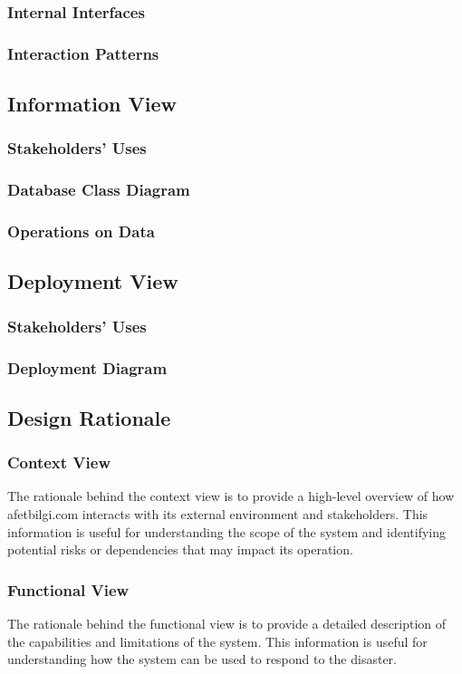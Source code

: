 \documentclass[a4paper]{article}
\begin{document}
    \subsubsection{Internal Interfaces}
    \lipsum[1-1]
    \subsubsection{Interaction Patterns}
    \lipsum[1-1]
    \subsection{Information View}
    \subsubsection{Stakeholders' Uses}
    \lipsum[1-1]
    \subsubsection{Database Class Diagram}
    \subsubsection{Operations on Data}
    \lipsum[1-1]
    \subsection{Deployment View}
    \subsubsection{Stakeholders' Uses}
    \lipsum[1-1]
    \subsubsection{Deployment Diagram}
    \subsection{Design Rationale}
    \subsubsection{Context View}
    The rationale behind the context view is to provide a high-level overview of how afetbilgi.com interacts with its external
    environment and stakeholders. This information is useful for understanding the scope of the system and identifying potential
    risks or dependencies that may impact its operation.
    \subsubsection{Functional View}
    The rationale behind the functional view is to provide a detailed description of the capabilities and limitations of the
    system. This information is useful for understanding how the system can be used to respond to the disaster.
\end{document}

